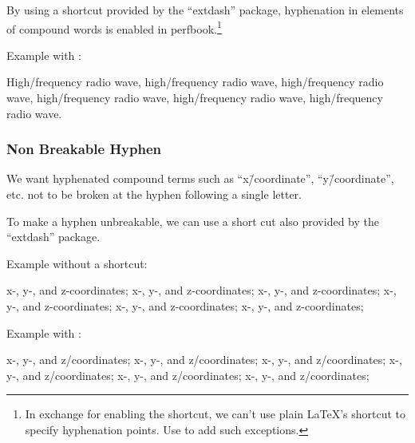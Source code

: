 By using a shortcut \qco{\\-/} provided by the
``extdash'' package, hyphenation in elements of compound
words is enabled in perfbook.\footnote{
  In exchange for enabling the shortcut, we can't use plain
  \LaTeX's shortcut \qco{\\-} to specify hyphenation points.
  Use  to add such exceptions.
}

Example with \qco{\\-/}:

\begin{center}\begin{minipage}{2.6in}\vspace{0.6\baselineskip}
  High\-/frequency radio wave, high\-/frequency radio wave,
  high\-/frequency radio wave, high\-/frequency radio wave,
  high\-/frequency radio wave, high\-/frequency radio wave.
\vspace{0.6\baselineskip}\end{minipage}\end{center}

\subsubsection{Non Breakable Hyphen}
\label{sec:app:styleguide:Non Breakable Hyphen}

We want hyphenated compound terms such as ``x\=/coordinate'',
``y\=/coordinate'', etc. not to be broken at the hyphen
following a single letter.

To make a hyphen unbreakable, we can use a short cut
\qco{\\=/} also provided by the ``extdash'' package.

Example without a shortcut:

\begin{center}\begin{minipage}{2.55in}\vspace{0.6\baselineskip}
x-, y-, and z-coordinates; x-, y-, and z-coordinates;
x-, y-, and z-coordinates; x-, y-, and z-coordinates;
x-, y-, and z-coordinates; x-, y-, and z-coordinates;
\vspace{0.6\baselineskip}\end{minipage}\end{center}

Example with \qco{\\-/}:

\begin{center}\begin{minipage}{2.55in}\vspace{0.6\baselineskip}
x-, y-, and z\-/coordinates; x-, y-, and z\-/coordinates;
x-, y-, and z\-/coordinates; x-, y-, and z\-/coordinates;
x-, y-, and z\-/coordinates; x-, y-, and z\-/coordinates;
\vspace{0.6\baselineskip}\end{minipage}\end{center}

